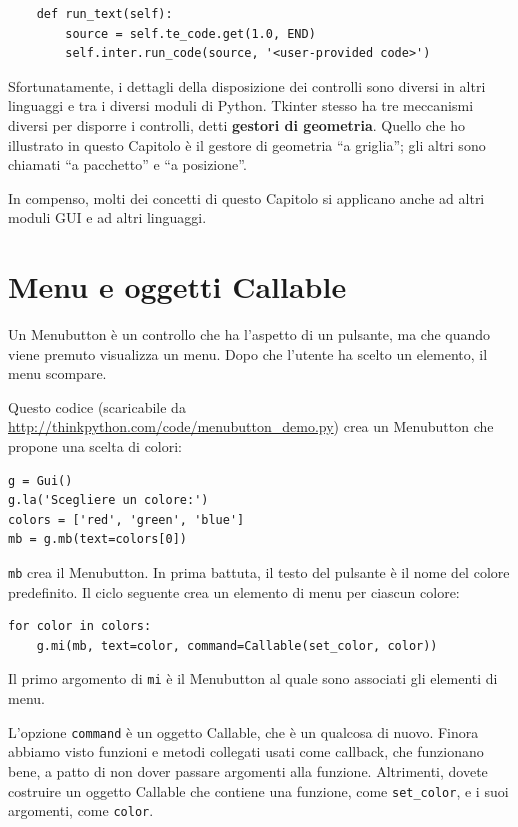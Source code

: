 \documentclass[10pt]{book}
\begin{document}
\begin{verbatim}
    def run_text(self):
        source = self.te_code.get(1.0, END)
        self.inter.run_code(source, '<user-provided code>')
\end{verbatim}
%
Sfortunatamente, i dettagli della disposizione dei controlli sono diversi in altri linguaggi e tra i diversi moduli di Python. Tkinter stesso ha tre meccanismi diversi per disporre i controlli, detti {\bf gestori di geometria}.
Quello che ho illustrato in questo Capitolo è il gestore di geometria ``a griglia''; gli altri sono chiamati ``a pacchetto'' e ``a posizione''.

In compenso, molti dei concetti di questo Capitolo si applicano anche ad altri moduli GUI e ad altri linguaggi.


\section{Menu e oggetti Callable}

Un Menubutton è un controllo che ha l'aspetto di un pulsante, ma che quando viene premuto visualizza un menu. Dopo che l'utente ha scelto un elemento, il menu scompare.

Questo codice (scaricabile da \url{http://thinkpython.com/code/menubutton_demo.py}) crea un Menubutton che propone una scelta di colori:

\begin{verbatim}
g = Gui()
g.la('Scegliere un colore:')
colors = ['red', 'green', 'blue']
mb = g.mb(text=colors[0])
\end{verbatim}
%
{\tt mb} crea il Menubutton. In prima battuta, il testo del pulsante è il nome del colore predefinito. Il ciclo seguente crea un elemento di menu per ciascun colore:

\begin{verbatim}
for color in colors:
    g.mi(mb, text=color, command=Callable(set_color, color))
\end{verbatim}
%
Il primo argomento di {\tt mi} è il Menubutton al quale sono associati gli elementi di menu.

L'opzione {\tt command} è un oggetto Callable, che è un qualcosa di nuovo.
Finora abbiamo visto funzioni e metodi collegati usati come callback, che funzionano bene, a patto di non dover passare argomenti alla funzione. Altrimenti, dovete costruire un oggetto Callable che contiene una funzione, come \verb"set_color", e i suoi argomenti, come {\tt color}.
\end{document}
